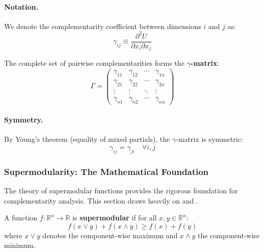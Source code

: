 \paragraph{Notation.}
We denote the complementarity coefficient between dimensions $i$ and $j$ as:
\begin{equation}
    \gamma_{ij} \equiv \frac{\partial^2 U}{\partial x_i \partial x_j}
    \label{eq:gamma-def}
\end{equation}

The complete set of pairwise complementarities forms the \textbf{$\gamma$-matrix}:
\begin{equation}
    \Gamma = \begin{pmatrix}
        \gamma_{11} & \gamma_{12} & \cdots & \gamma_{1n} \\
        \gamma_{21} & \gamma_{22} & \cdots & \gamma_{2n} \\
        \vdots & \vdots & \ddots & \vdots \\
        \gamma_{n1} & \gamma_{n2} & \cdots & \gamma_{nn}
    \end{pmatrix}
    \label{eq:gamma-matrix}
\end{equation}

\paragraph{Symmetry.}
By Young's theorem (equality of mixed partials), the $\gamma$-matrix is symmetric:
\begin{equation}
    \gamma_{ij} = \gamma_{ji} \quad \forall i, j
    \label{eq:gamma-symmetry}
\end{equation}

\subsubsection{Supermodularity: The Mathematical Foundation}

The theory of supermodular functions provides the rigorous foundation for 
complementarity analysis. This section draws heavily on \citet{topkis1978}
and \citet{milgromroberts1990compare}.

\begin{definition}[Supermodularity]
\label{def:supermodularity}
A function $f: \mathbb{R}^n \to \mathbb{R}$ is \textbf{supermodular} if 
for all $x, y \in \mathbb{R}^n$:
\begin{equation}
    f(x \vee y) + f(x \wedge y) \geq f(x) + f(y)
    \label{eq:supermodular-lattice}
\end{equation}
where $x \vee y$ denotes the component-wise maximum and $x \wedge y$ the 
component-wise minimum.
\end{definition}

